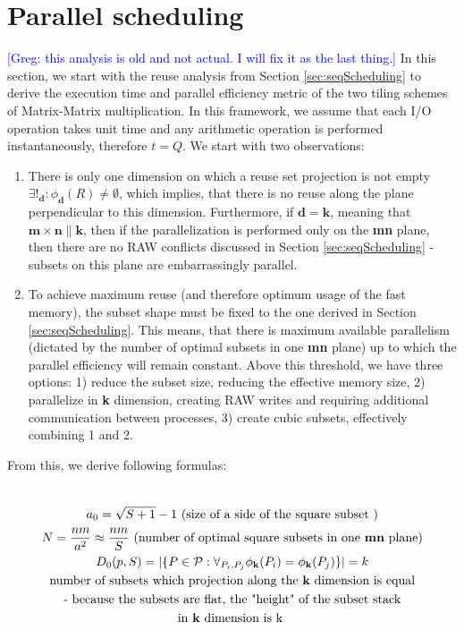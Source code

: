 \documentclass[sigplan,review,anonymous]{acmart}\settopmatter{printfolios=true,printccs=false,printacmref=false}
\newcommand\greg[1]{\textcolor{blue}{[Greg: #1]}}
\begin{document}
\appendix
\section{Parallel scheduling}
\greg{this analysis is old and not actual. I will fix it as the last thing.}
In this section, we start with the reuse analysis from Section 
\ref{sec:seqScheduling} 
to derive the execution time and parallel efficiency metric of the two tiling 
schemes of Matrix-Matrix multiplication. In this framework, we assume that each 
I/O operation takes unit time and any arithmetic operation is performed 
instantaneously, therefore $t = Q$. We start with two observations:

\begin{enumerate}
\item There is only one dimension on 
which a reuse set projection is not empty $\exists!_{\mathbf{d}}: 
\phi_{\mathbf{d}}(R) \ne 
\emptyset$, which implies, that there is no reuse along the plane 
perpendicular 
to this dimension. Furthermore, if $\mathbf{d} = \mathbf{k}$, meaning that 
$\mathbf{m} \times \mathbf{n} \parallel \mathbf{k}$, then if the 
parallelization is performed only on the \textbf{mn} plane, then there are 
no RAW 
conflicts discussed in Section \ref{sec:seqScheduling} - subsets on 
this 
plane are embarrassingly parallel. 
\item To achieve maximum reuse (and therefore optimum usage 
of the fast memory), the subset shape must be fixed to the one derived 
in 
Section \ref{sec:seqScheduling}. This means, that there is maximum 
available 
parallelism (dictated by the number of optimal subsets in one 
\textbf{mn} plane) up to which the parallel efficiency will remain 
constant. Above this threshold, we have three options: 1) reduce the 
subset size, reducing the effective memory size, 2) parallelize in 
\textbf{k} dimension, creating RAW writes and requiring additional 
communication between processes, 3) create cubic subsets, effectively 
combining 1 and 2.
\end{enumerate}

From this, we derive following formulas:

\begin{multline}
\\
a_0 = \sqrt{S+1} - 1  \text{ (size of a side of the square subset )}\\
N = \frac{nm}{a^2} \approx \frac{nm}{S} \text{ (number of optimal square 
	subsets in one \textbf{mn} plane)}\\
D_0(p,S) = |\{P \in \mathcal{P} : \forall_{P_i, P_j} \phi_{\mathbf{k}}(P_i) = 
\phi_{\mathbf{k}}(P_j)\}| = k \\
\text{number of subsets which projection along the \textbf{k} dimension is 
	equal} \\ 
\text{- because the subsets are flat, the "height" of the 
	subset stack}
\\ 
\text{in \textbf{k} dimension is k }\\
\end{multline}
\end{document}
